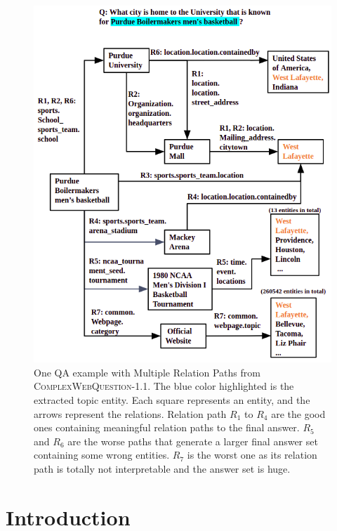 \begin{figure}[t]
 \centering
 \includegraphics[width=1\linewidth]{figs/fig1.png}
 \caption{One QA example with Multiple Relation Paths from \textsc{ComplexWebQuestion}-1.1. The blue color highlighted is the extracted topic entity. Each square represents an entity, and the arrows represent the relations. Relation path $R_1$ to $R_4$ are the good ones containing meaningful relation paths to the final answer. $R_5$ and $R_6$ are the worse paths that generate a larger final answer set containing some wrong entities. $R_7$ is the worst one as its relation path is totally not interpretable and the answer set is huge.}
 \label{QAPaths}
\end{figure}

\section{Introduction}

